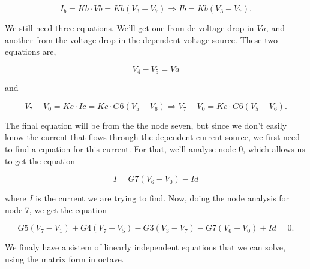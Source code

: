  \begin{equation}
  I_b = Kb \cdot Vb = Kb(V_3-V_7) \Rightarrow Ib = Kb(V_3-V_7).
  \label{eq:Ib}
\end{equation}

\par We still need three equations. We'll get one from de voltage drop in $Va$, and another from the voltage drop in the dependent voltage source. These two equations are,

  \begin{equation}
  V_4-V_5 = Va
  \label{eq:Va}
\end{equation}

and

 \begin{equation}
  V_7-V_0 = Kc \cdot Ic = Kc\cdot G6(V_5-V_6) \Rightarrow V_7-V_0 = Kc\cdot G6(V_5-V_6).
  \label{eq:Vc}
\end{equation}

\par The final equation will be from the the node seven, but since we don't easily know the current that flows through the dependent current source, we first need to find a equation for this current. For that, we'll analyse node 0, which allows us to get the equation

 \begin{equation}
  I = G7(V_6-V_0) - Id
  \label{eq:corrente}
\end{equation}

\noindent where $I$ is the current we are trying to find. Now, doing the node analysis for node 7, we get the equation

 \begin{equation}
  G5(V_7-V_1)+G4(V_7-V_5)-G3(V_3-V_7)-G7(V_6-V_0)+Id = 0.
  \label{eq:N3}
\end{equation}

\par We finaly have a sistem of linearly independent equations that we can solve, using the matrix form in octave.

